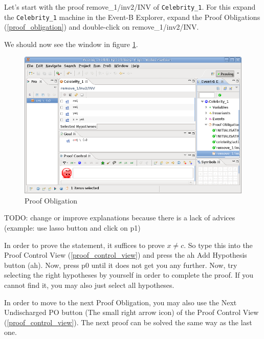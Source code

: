 Let's start with the proof \textsf{remove\_1/inv2/INV} of \texttt{Celebrity\_1}. For this expand the \texttt{Celebrity\_1} machine in the Event-B Explorer, expand the Proof Obligations (\ref{proof_obligation}) and double-click on \textsf{remove\_1/inv2/INV}.


We should now see the window in figure \ref{fig_tut_08_proof_obligation}.

\begin{figure}[!h]
\begin{center}
	\includegraphics{img/tutorial/tut_08_proof2.png}
	\caption{Proof Obligation}
	\label{fig_tut_08_proof_obligation}
\end{center}
\end{figure}

TODO: change or improve explanations because there is a lack of advices (example: use lasso button and click on p1)

In order to prove the statement, it suffices to prove \textsf{$x \neq c$}. So type this into the \textsf{Proof Control View} (\ref{proof_control_view}) and press the ah \textsf{Add Hypothesis button (ah)}. Now, press \textsf{p0} until it does not get you any further. Now, try selecting the right hypotheses by yourself in order to complete the proof. If you cannot find it, you may also just select all hypotheses.

In order to move to the next Proof Obligation, you may also use the \textsf{Next Undischarged PO button (The small right arrow icon)} of the \textsf{Proof Control View} (\ref{proof_control_view}). The next proof can be solved the same way as the last one.

